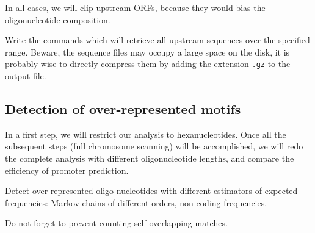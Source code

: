 In all cases, we will clip upstream ORFs, because they would bias the
oligonucleotide composition.

Write the commands which will retrieve all upstream sequences over the
specified range. Beware, the sequence files may occupy a large space
on the disk, it is probably wise to directly compress them by adding
the extension \texttt{.gz} to the output file.

\subsection{Detection of over-represented motifs}

In a first step, we will restrict our analysis to
hexanucleotides. Once all the subsequent steps (full chromosome
scanning) will be accomplished, we will redo the complete analysis
with different oligonucleotide lengths, and compare the efficiency of
promoter prediction.

Detect over-represented oligo-nucleotides with different estimators of
expected frequencies: Markov chains of different orders, non-coding
frequencies. 

Do not forget to prevent counting self-overlapping matches.

